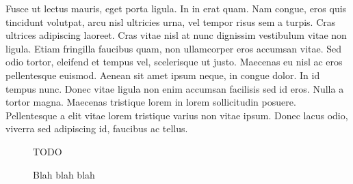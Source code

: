 \documentclass{sig-alternate}
\begin{document}
Fusce ut lectus mauris, eget porta ligula. In in erat quam. Nam congue, eros quis tincidunt volutpat, arcu nisl ultricies urna, vel tempor risus sem a turpis. Cras ultrices adipiscing laoreet. Cras vitae nisl at nunc dignissim vestibulum vitae non ligula. Etiam fringilla faucibus quam, non ullamcorper eros accumsan vitae. Sed odio tortor, eleifend et tempus vel, scelerisque ut justo. Maecenas eu nisl ac eros pellentesque euismod. Aenean sit amet ipsum neque, in congue dolor. In id tempus nunc. Donec vitae ligula non enim accumsan facilisis sed id eros. Nulla a tortor magna. Maecenas tristique lorem in lorem sollicitudin posuere. Pellentesque a elit vitae lorem tristique varius non vitae ipsum. Donec lacus odio, viverra sed adipiscing id, faucibus ac tellus.

\begin{figure}[t!]
    \centering
    \begin{boxedminipage}{\columnwidth}
        \vspace{1.5in}
        TODO
    \end{boxedminipage}
   \caption{Blah blah blah}
\end{figure}
\end{document}
